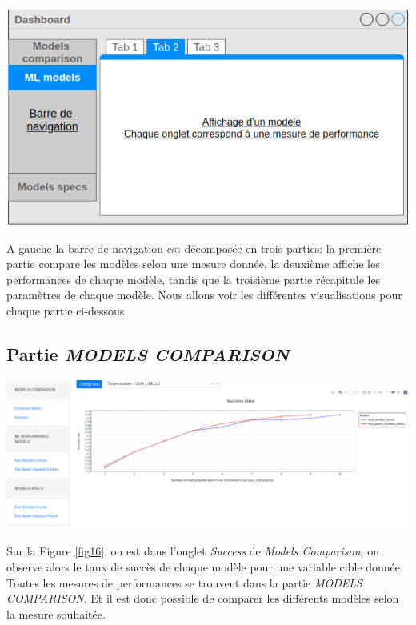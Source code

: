 \begin{center}
\includegraphics[scale=0.55]{figures/schema_app.png}
\label{fig15}
\end{center}

A gauche la barre de navigation est décomposée en trois parties: la première partie compare les modèles selon une mesure donnée, la deuxième affiche les performances de chaque modèle, tandis que la troisième partie récapitule les paramètres de chaque modèle. Nous allons voir les différentes visualisations pour chaque partie ci-dessous.

\subsection{Partie \textit{MODELS COMPARISON}}

\begin{center}
\includegraphics[scale=0.25]{figures/app_comparison.png}
\label{fig16}
\end{center}

Sur la Figure \ref{fig16}, on est dans l’onglet \textit{Success} de \textit{Models Comparison}, on observe alors le taux de succès de chaque modèle pour une variable cible donnée. Toutes les mesures de performances se trouvent dans la partie \textit{MODELS COMPARISON}. Et il est donc possible de comparer les différents modèles selon la mesure souhaitée.

